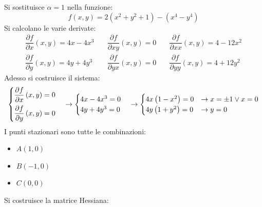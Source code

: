 \documentclass[a4paper]{article}
\begin{document}
	\noindent
	Si sostituisce $\alpha = 1$ nella funzione:
	\begin{equation*}
		f\left(x,y\right) = 2\left(x^{2}+y^{2}+1\right) - \left(x^{4}-y^{4}\right)
	\end{equation*}
	Si calcolano le varie derivate:
	\begin{equation*}
		\begin{array}{rcl}
			\dfrac{\partial f}{\partial x}\left(x,y\right) = 4x-4x^{3} \hspace{1em} & \dfrac{\partial f}{\partial xy}\left(x,y\right) = 0 \hspace{1em} & \dfrac{\partial f}{\partial xx}\left(x,y\right) = 4-12x^{2} \\ [1em]
			\dfrac{\partial f}{\partial y}\left(x,y\right) = 4y+4y^{3} \hspace{1em} & \dfrac{\partial f}{\partial yx}\left(x,y\right) = 0 \hspace{1em} & \dfrac{\partial f}{\partial yy}\left(x,y\right) = 4+12y^{2}
		\end{array}
	\end{equation*}
	Adesso si costruisce il sistema:
	\begin{equation*}
		\begin{cases}
			\dfrac{\partial f}{\partial x}\left(x,y\right) = 0 \vspace{.5em} \\
			\dfrac{\partial f}{\partial y}\left(x,y\right) = 0
		\end{cases}
		\rightarrow
		\begin{cases}
			4x-4x^{3} = 0 \\
			4y+4y^{3} = 0
		\end{cases}
		\rightarrow
		\begin{cases}
			4x\left(1-x^{2}\right) = 0 & \rightarrow x = \pm 1 \lor x = 0 \\
			4y\left(1+y^{2}\right) = 0 & \rightarrow y = 0
		\end{cases}
	\end{equation*}
	I punti stazionari sono tutte le combinazioni:
	\begin{multicols}{3}
		\begin{itemize}
			\item $A\left(1,0\right)$
			\item $B\left(-1,0\right)$
			\item $C\left(0,0\right)$
		\end{itemize}
	\end{multicols}
	Si costruisce la matrice Hessiana:
\end{document}
